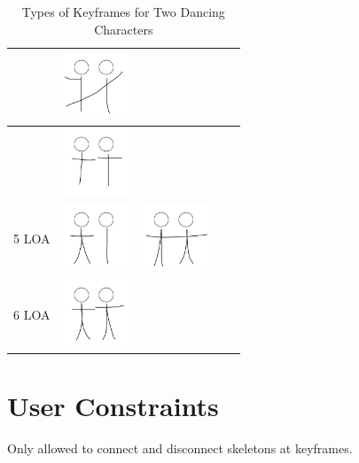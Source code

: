 \begin{table}[!htb]
\begin{tabular}{ | c | c || c | c | c | }
\begin{minipage}{.15\textwidth}
    \end{minipage} 
    & 
    \begin{minipage}{.15\textwidth}
      \includegraphics[width=\linewidth, height=20mm]{img/09keyframe}
    \end{minipage} 
    \\ \hline 
    &
    \begin{minipage}{.15\textwidth}
      \includegraphics[width=\linewidth, height=20mm]{img/4-1loa_separate_keyframe}
    \end{minipage}
    & & & 
    \\ \hline
    5 LOA 
    &
    \begin{minipage}{.15\textwidth}
      \includegraphics[width=\linewidth, height=20mm]{img/5loa_separate_keyframe}
    \end{minipage}
    &
    \begin{minipage}{.15\textwidth}
      \includegraphics[width=\linewidth, height=20mm]{img/10keyframe}
    \end{minipage} & & 
    \\ \hline
    6 LOA 
    &
    \begin{minipage}{.15\textwidth}
      \includegraphics[width=\linewidth, height=20mm]{img/6loa_separate_keyframe}
    \end{minipage}
    & & & 
    \\ \hline
  \end{tabular}
  \caption{Types of Keyframes for Two Dancing Characters}
  \label{table:LOAChart}
\end{table}


\section{User Constraints}
Only allowed to connect and disconnect skeletons at keyframes.
